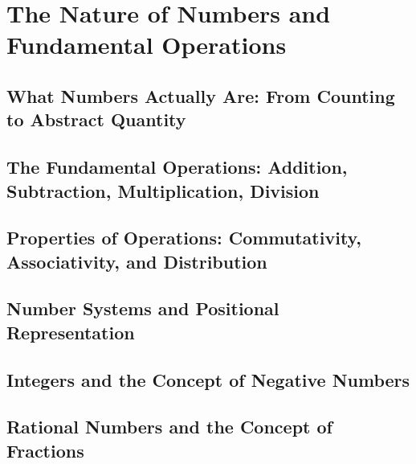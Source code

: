 
\chapter{The Nature of Numbers and Fundamental Operations}

\section{What Numbers Actually Are: From Counting to Abstract Quantity}

\section{The Fundamental Operations: Addition, Subtraction, Multiplication, Division}

\section{Properties of Operations: Commutativity, Associativity, and Distribution}

\section{Number Systems and Positional Representation}

\section{Integers and the Concept of Negative Numbers}

\section{Rational Numbers and the Concept of Fractions}
